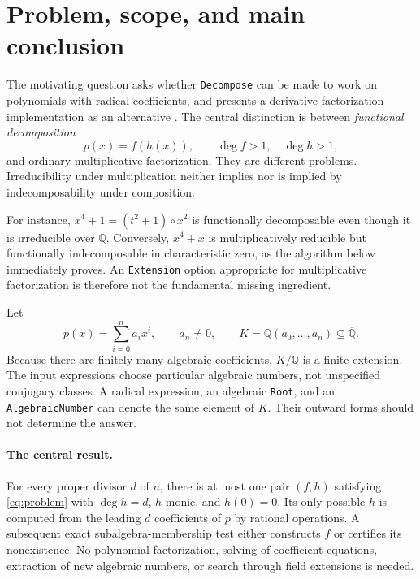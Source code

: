 \documentclass[11pt,a4paper]{article}
\numberwithin{equation}{section}
\theoremstyle{definition}
\theoremstyle{remark}
\newcommand{\Q}{\mathbb{Q}}
\newcommand{\Qbar}{\overline{\mathbb{Q}}}
\newcommand{\code}[1]{\texttt{#1}}
\begin{document}
\section{Problem, scope, and main conclusion}
\label{sec:intro}
The motivating question asks whether \code{Decompose} can be made to work on
polynomials with radical coefficients, and presents a derivative-factorization
implementation as an alternative \cite{SE}. The central distinction is between
\emph{functional decomposition}
\begin{equation}
 p(x)=f(h(x)),\qquad \deg f>1,\quad \deg h>1,
 \label{eq:problem}
\end{equation}
and ordinary multiplicative factorization. They are different problems.
Irreducibility under multiplication neither implies nor is implied by
indecomposability under composition.

For instance, $x^4+1=(t^2+1)\circ x^2$ is functionally decomposable even though
it is irreducible over $\Q$. Conversely, $x^4+x$ is multiplicatively reducible
but functionally indecomposable in characteristic zero, as the algorithm below
immediately proves. An \code{Extension} option appropriate for multiplicative
factorization is therefore not the fundamental missing ingredient.

Let
\begin{equation}
 p(x)=\sum_{i=0}^{n}a_i x^i,\qquad a_n\ne0,
 \qquad K=\Q(a_0,\ldots,a_n)\subseteq\Qbar.
 \label{eq:input}
\end{equation}
Because there are finitely many algebraic coefficients, $K/\Q$ is a finite
extension. The input expressions choose particular algebraic numbers, not
unspecified conjugacy classes. A radical expression, an algebraic
\code{Root}, and an \code{AlgebraicNumber} can denote the same element of $K$.
Their outward forms should not determine the answer.

\paragraph{The central result.}
For every proper divisor $d$ of $n$, there is at most one pair $(f,h)$ satisfying
\eqref{eq:problem} with $\deg h=d$, $h$ monic, and $h(0)=0$. Its only possible
$h$ is computed from the leading $d$ coefficients of $p$ by rational
operations. A subsequent exact subalgebra-membership test either constructs
$f$ or certifies its nonexistence. No polynomial factorization, solving of
coefficient equations, extraction of new algebraic numbers, or search through
field extensions is needed.
\end{document}
